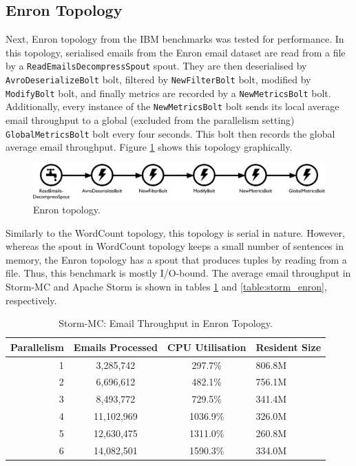 \documentclass[bsc,logo,frontabs,twoside,singlespacing,normalheadings,parskip]{infthesis}\usepackage[]{graphicx}\usepackage[]{color}
\begin{document}
\subsection{Enron Topology}

Next, Enron topology from the IBM benchmarks was tested for performance. In this topology, serialised emails from the Enron email dataset are read from a file by a \texttt{ReadEmailsDecompressSpout} spout. They are then deserialised by \texttt{AvroDeserializeBolt} bolt, filtered by \texttt{NewFilterBolt} bolt, modified by \texttt{ModifyBolt} bolt, and finally metrics are recorded by a \texttt{NewMetricsBolt} bolt. Additionally, every instance of the \texttt{NewMetricsBolt} bolt sends its local average email throughput to a global (excluded from the parallelism setting) \texttt{GlobalMetricsBolt} bolt every four seconds. This bolt then records the global average email throughput. Figure \ref{fig:enron_topology} shows this topology graphically.

\begin{figure}[!htb]
\begin{adjustwidth}{-0.5in}{-0.5in}
	\centering
	\includegraphics[scale=0.475]{pdf/enron_topology.pdf}
	\caption{Enron topology.}
	\label{fig:enron_topology}
\end{adjustwidth}
\end{figure}

Similarly to the WordCount topology, this topology is serial in nature. However, whereas the spout in  WordCount topology keeps a small number of sentences in memory, the Enron topology has a spout that produces tuples by reading from a file. Thus, this benchmark is mostly I/O-bound. The average email throughput in Storm-MC and Apache Storm is shown in tables \ref{table:storm_mc_enron} and \ref{table:storm_enron}, respectively. 

\begin{table}[!htb]
\begin{adjustwidth}{-0.5in}{-0.5in}
\centering
\small
\begin{tabular}{@{}rccl@{}}
    \textbf{Parallelism} & \textbf{Emails Processed} & \textbf{CPU Utilisation} & \textbf{Resident Size} \\ \toprule
    1 & {3,285,742} & {297.7\%} & {806.8M} \\
    2 & {6,696,612} & {482.1\%} & {756.1M} \\
    3 & {8,493,772} & {729.5\%} & {341.4M} \\
    4 & {11,102,969} & {1036.9\%} & {326.0M} \\
    5 & {12,630,475} & {1311.0\%} & {260.8M} \\
    6 & {14,082,501} & {1590.3\%} & {334.0M} \\
\end{tabular}
\caption{Storm-MC: Email Throughput in Enron Topology.}
\label{table:storm_mc_enron}
\end{adjustwidth}
\end{table}
\end{document}
